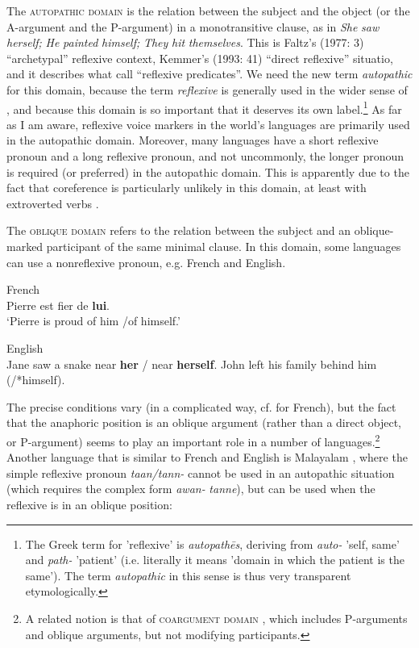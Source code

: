\documentclass[output=paper]{langscibook}
\begin{document}
The \textsc{autopathic} \textsc{domain} is the relation between the subject and the object (or the A-argument and the P-argument) in a monotransitive clause, as in \textit{She} \textit{saw} \textit{herself;} \textit{He} \textit{painted} \textit{himself;} \textit{They} \textit{hit} \textit{themselves}. This is Faltz’s (1977: 3) “archetypal” reflexive context, Kemmer’s (1993: 41) “direct reflexive” situatio, and it describes what \citet{Reinhart1993} call “reflexive predicates”. We need the new term \textit{autopathic} for this domain, because the term \textit{reflexive} is generally used in the wider sense of , and because this domain is so important that it deserves its own label.\footnote{ {The Greek term for ’reflexive’ is} {\textit{autopathēs}}{, deriving from} {\textit{auto-}} {’self, same’ and} {\textit{path-}} {’patient’ (i.e. literally it means ’domain in which the patient is the same’). The term} {\textit{autopathic}} {in this sense is thus very transparent etymologically.}} As far as I am aware, reflexive voice markers in the world’s languages are primarily used in the autopathic domain. Moreover, many languages have a short reflexive pronoun and a long reflexive pronoun, and not uncommonly, the longer pronoun is required (or preferred) in the autopathic domain. This is apparently due to the fact that coreference is particularly unlikely in this domain, at least with extroverted verbs \citep{Koenig2004, Haspelmath2008}.

 The \textsc{oblique} \textsc{domain} refers to the relation between the subject and an oblique-marked participant of the same minimal clause. In this domain, some languages can use a nonreflexive pronoun, e.g. French and English.

\ea%
    French\label{ex:Haspelmath:38}\\
    {Pierre} {est} {fier} {de} \textbf{{lui}}.\\
   ‘Pierre is proud of him /of himself.’
\z

\ea%
    English\label{ex:Haspelmath:39}\\
   \ea \label{ex:Haspelmath:39a}{Jane} {saw} {a} {snake} {near} \textbf{{her}} {/} {near} \textbf{{herself}}.
    \ex \label{ex:Haspelmath:39b} {John} {left} {his} {family} {behind} {him} {(/*himself).} \citep[43]{Kiparsky2002}
    \z
\z 


The precise conditions vary (in a complicated way, cf. \citealt{Zribi1995} for French), but the fact that the anaphoric position is an oblique argument (rather than a direct object, or P-argument) seems to play an important role in a number of languages.\footnote{ {A related notion is that of} {\textsc{coargument} \textsc{domain}} {\citep{Kiparsky2002}, which includes P-arguments and oblique arguments, but not modifying participants.}}   Another language that is similar to French and English is Malayalam \citep{Jayaseelan2000}, where the simple reflexive pronoun \textit{taan/tann-} cannot be used in an autopathic situation (which requires the complex form \textit{awan-} \textit{tanne}), but can be used when the reflexive is in an oblique position:
\end{document}
